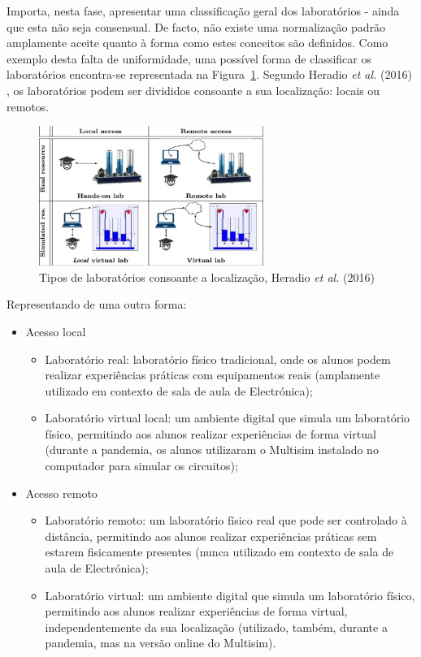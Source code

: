 Importa, nesta fase, apresentar uma classificação geral dos laboratórios - ainda que esta não seja consensual. De facto, não existe uma normalização padrão amplamente aceite quanto à forma como estes conceitos são definidos. Como exemplo desta falta de uniformidade, uma possível forma de classificar os laboratórios encontra-se representada na Figura~\ref{fig:classificaçãoHeratio}. Segundo Heradio \textit{et al.} (2016) \cite{HERADIO20161}, os laboratórios podem ser divididos consoante a sua localização: locais ou remotos.

\begin{figure}[hbtp]
    \centering
    \includegraphics[width=0.65\textwidth]{figures/caracteristica_laboratories.jpg}
    \caption{Tipos de laboratórios consoante a localização, Heradio \textit{et al.} (2016) \cite{HERADIO20161}}
    \label{fig:classificaçãoHeratio}
\end{figure}

Representando de uma outra forma:
\begin{itemize}
    \item Acesso local
          \begin{itemize}
              \item Laboratório real: laboratório físico tradicional, onde os alunos podem realizar experiências práticas com equipamentos reais (amplamente utilizado em contexto de sala de aula de Electrónica);
              \item Laboratório virtual local: um ambiente digital que simula um laboratório físico, permitindo aos alunos realizar experiências de forma virtual (durante a pandemia, os alunos utilizaram o Multisim instalado no computador para simular os circuitos);
          \end{itemize}
    \item Acesso remoto
          \begin{itemize}
              \item Laboratório remoto: um laboratório físico real que pode ser controlado à distância, permitindo aos alunos realizar experiências práticas sem estarem fisicamente presentes (nunca utilizado em contexto de sala de aula de Electrónica);
              \item Laboratório virtual: um ambiente digital que simula um laboratório físico, permitindo aos alunos realizar experiências de forma virtual, independentemente da sua localização (utilizado, também, durante a pandemia, mas na versão online do Multisim).
          \end{itemize}
\end{itemize}

